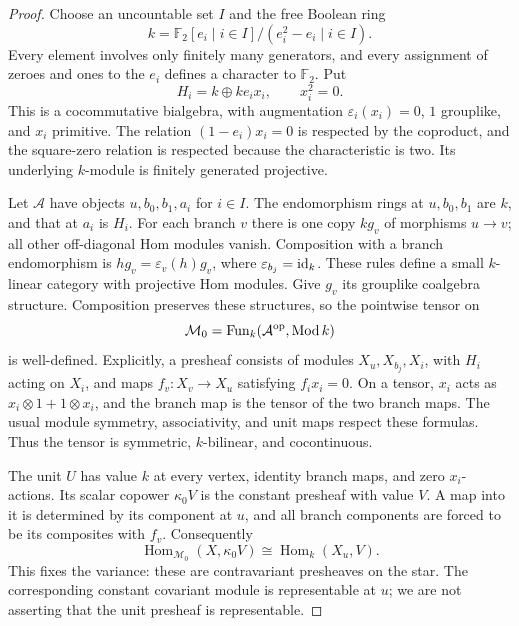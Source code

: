 \begin{proof}
Choose an uncountable set $I$ and the free Boolean ring
\[
 k=\mathbb F_2[e_i\mid i\in I]/(e_i^2-e_i\mid i\in I).
\]
Every element involves only finitely many generators, and every assignment of zeroes and ones to the $e_i$ defines a character to $\mathbb F_2$. Put
\[
 H_i=k\oplus ke_i x_i,\qquad x_i^2=0.
\]
This is a cocommutative bialgebra, with augmentation $\varepsilon_i(x_i)=0$, $1$ grouplike, and $x_i$ primitive. The relation $(1-e_i)x_i=0$ is respected by the coproduct, and the square-zero relation is respected because the characteristic is two. Its underlying $k$-module is finitely generated projective.

Let $\mathcal A$ have objects $u,b_0,b_1,a_i$ for $i\in I$. The endomorphism rings at $u,b_0,b_1$ are $k$, and that at $a_i$ is $H_i$. For each branch $v$ there is one copy $kg_v$ of morphisms $u\to v$; all other off-diagonal Hom modules vanish. Composition with a branch endomorphism is $h g_v=\varepsilon_v(h)g_v$, where $\varepsilon_{b_j}=\operatorname{id}_k$. These rules define a small $k$-linear category with projective Hom modules. Give $g_v$ its grouplike coalgebra structure. Composition preserves these structures, so the pointwise tensor on
\[
 \mathcal M_0=\operatorname{Fun}_k(\mathcal A^{\mathrm{op}},\operatorname{Mod} k)
\]
is well-defined. Explicitly, a presheaf consists of modules $X_u,X_{b_j},X_i$, with $H_i$ acting on $X_i$, and maps $f_v:X_v\to X_u$ satisfying $f_i x_i=0$. On a tensor, $x_i$ acts as $x_i\otimes1+1\otimes x_i$, and the branch map is the tensor of the two branch maps. The usual module symmetry, associativity, and unit maps respect these formulas. Thus the tensor is symmetric, $k$-bilinear, and cocontinuous.

The unit $U$ has value $k$ at every vertex, identity branch maps, and zero $x_i$-actions. Its scalar copower $\kappa_0V$ is the constant presheaf with value $V$. A map into it is determined by its component at $u$, and all branch components are forced to be its composites with $f_v$. Consequently
\[
 \operatorname{Hom}_{\mathcal M_0}(X,\kappa_0V)
 \cong\operatorname{Hom}_k(X_u,V).
\]
This fixes the variance: these are contravariant presheaves on the star. The corresponding constant covariant module is representable at $u$; we are not asserting that the unit presheaf is representable.


\end{proof}
